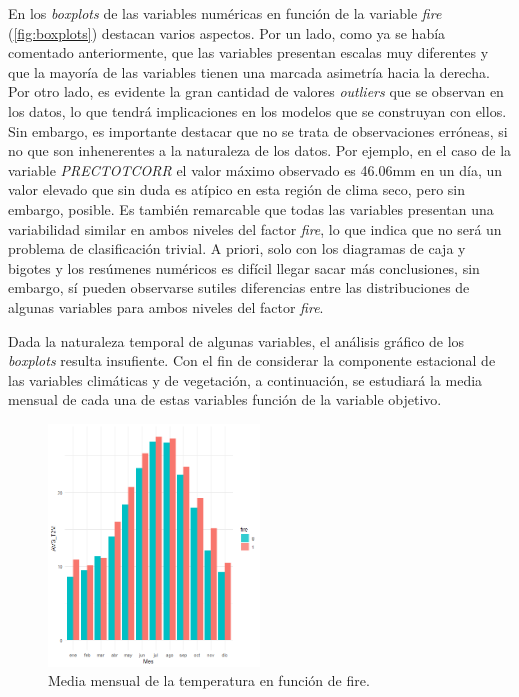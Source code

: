\documentclass[12pt,a4paper,]{book}
\numberwithin{dummy}{section}
\theoremstyle{ocrenumbox}
\theoremstyle{blacknumex}
\theoremstyle{blacknumbox}
\theoremstyle{ocrenum}
\theoremstyle{ocrenum}
\begin{document}
En los \emph{boxplots} de las variables numéricas en función de la
variable \emph{fire} (\ref{fig:boxplots}) destacan varios aspectos. Por
un lado, como ya se había comentado anteriormente, que las variables
presentan escalas muy diferentes y que la mayoría de las variables
tienen una marcada asimetría hacia la derecha. Por otro lado, es
evidente la gran cantidad de valores \emph{outliers} que se observan en
los datos, lo que tendrá implicaciones en los modelos que se construyan
con ellos. Sin embargo, es importante destacar que no se trata de
observaciones erróneas, si no que son inhenerentes a la naturaleza de
los datos. Por ejemplo, en el caso de la variable \emph{PRECTOTCORR} el
valor máximo observado es 46.06mm en un día, un valor elevado que sin
duda es atípico en esta región de clima seco, pero sin embargo, posible.
Es también remarcable que todas las variables presentan una variabilidad
similar en ambos niveles del factor \emph{fire}, lo que indica que no
será un problema de clasificación trivial. A priori, solo con los
diagramas de caja y bigotes y los resúmenes numéricos es difícil llegar
sacar más conclusiones, sin embargo, sí pueden observarse sutiles
diferencias entre las distribuciones de algunas variables para ambos
niveles del factor \emph{fire}.

Dada la naturaleza temporal de algunas variables, el análisis gráfico de
los \emph{boxplots} resulta insufiente. Con el fin de considerar la
componente estacional de las variables climáticas y de vegetación, a
continuación, se estudiará la media mensual de cada una de estas
variables función de la variable objetivo.

\begin{figure}[H]
\centering
\includegraphics[width = 0.5\textwidth]{graficos/T2M_mes.png}
\caption{Media mensual de la temperatura en función de fire.}
\label{fig:T2M_mes}
\end{figure}
\end{document}

